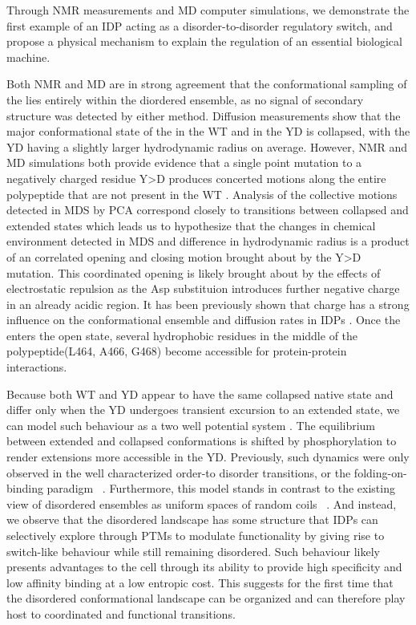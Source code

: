Through NMR measurements and MD computer simulations, we demonstrate the first example of an IDP acting as a disorder-to-disorder regulatory switch, and propose a physical mechanism to explain the regulation of an essential biological machine. 


Both NMR and MD are in strong agreement that the conformational sampling of the \gct lies entirely within the diordered ensemble, as no signal of secondary structure was detected by either method. Diffusion measurements show that the major conformational state of the \gct in the WT and in the YD is collapsed, with the YD having a slightly larger hydrodynamic radius on average. However, NMR and MD simulations both provide evidence that a single point mutation to a negatively charged residue Y>D produces concerted motions along the entire polypeptide that are not present in the WT \gct. Analysis of the collective motions detected in MDS by PCA correspond closely to transitions between collapsed and extended states which leads us to hypothesize that the changes in chemical environment detected in MDS and difference in hydrodynamic radius is a product of an correlated opening and closing motion brought about by the Y>D mutation. This coordinated opening is likely brought about by the effects of electrostatic repulsion as the Asp substituion introduces further negative charge in an already acidic region. It has been previously shown that charge has a strong influence on the conformational ensemble and diffusion rates in IDPs \cite{mao2010net}. Once the \gct enters the open state, several hydrophobic residues in the middle of the polypeptide(L464, A466, G468) become accessible for protein-protein interactions.

 Because both WT and YD appear to have the same collapsed native state and differ only when the YD undergoes transient excursion to an extended state, we can model such behaviour as a two well potential system . The equilibrium between extended and collapsed conformations is shifted by phosphorylation to render extensions more accessible in the YD.  Previously, such dynamics were only observed in the well characterized order-to disorder transitions, or the folding-on-binding paradigm ~\cite{tompa2012intrinsically}. Furthermore, this model stands in contrast to the existing view of disordered ensembles as uniform  spaces of random coils ~\cite{mittag2007atomic}. And instead, we observe that the disordered landscape has some structure that IDPs can selectively explore  through PTMs to modulate functionality by giving rise to switch-like behaviour while still remaining disordered. Such behaviour likely presents advantages to the cell through its ability to provide high specificity and low affinity binding at a low entropic cost. This suggests for the first time that the disordered conformational landscape can be organized and can therefore play host to coordinated and functional transitions.

